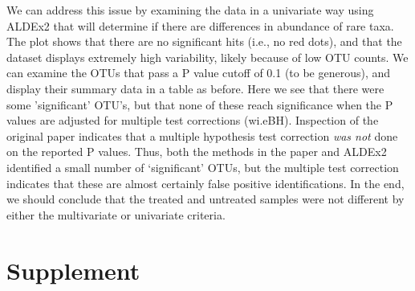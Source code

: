 \documentclass[11pt]{article}\usepackage[]{graphicx}\usepackage[]{color}
\begin{document}
We can address this issue by examining the data in a univariate way using ALDEx2 that will determine if there are differences in abundance of rare taxa. The plot shows that there are no significant hits (i.e., no red dots), and that the dataset displays extremely high variability, likely because of low OTU counts. We can examine the OTUs that pass a P value cutoff of 0.1 (to be generous), and display their summary data in a table as before. Here we see that there were some 'significant' OTU's, but that none of these reach significance when the P values are adjusted for multiple test corrections (wi.eBH). Inspection of the original paper indicates that a multiple hypothesis test correction \emph{was not} done on the reported P values. Thus, both the methods in the paper and ALDEx2 identified a small number of `significant' OTUs, but the multiple test correction indicates that these are almost certainly false positive identifications. In the end, we should conclude that the treated and untreated samples were not different by either the multivariate or univariate criteria. 



\section{Supplement}
 
%
\end{document}

